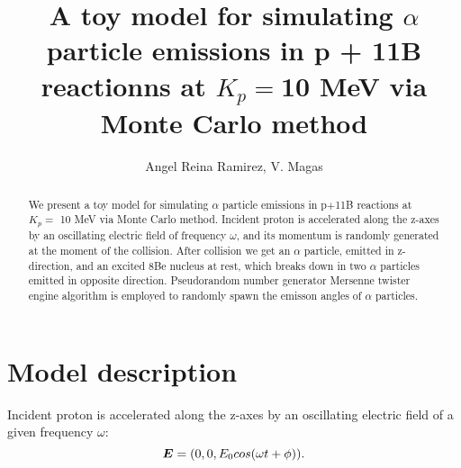 \documentclass[12pt]{report}
\renewcommand{\vec}[1]{\mbox{\boldmath$#1$}}
\begin{document}
\title{A toy model for simulating $\alpha$ particle emissions in p + 11B reactionns at $K_p=$10 MeV via Monte Carlo method}

\author{Angel Reina Ramirez, V. Magas}
\smallskip

\maketitle
\tableofcontents

\begin{abstract}
We present a toy model for simulating $\alpha$ particle emissions in p$+$11B reactions at $K_p =$ 10 MeV via Monte Carlo method.  
Incident proton is accelerated along the z-axes by an oscillating electric field of frequency $\omega$, and its momentum is randomly generated at the moment of the collision. After collision we get an $\alpha$ particle, emitted in z-direction, and an excited 8Be nucleus at rest, which breaks down in two $\alpha$ particles emitted in opposite direction. Pseudorandom number generator Mersenne twister engine algorithm is employed to randomly spawn the emisson angles of $\alpha$ particles. 
\end{abstract}


\chapter{Model description}
Incident proton is accelerated along the z-axes by an oscillating electric field of a given frequency $\omega$:
\begin{equation}
\vec{E} = (0,0,E_0cos(\omega t + \phi)).
\end{equation}
\end{document}
